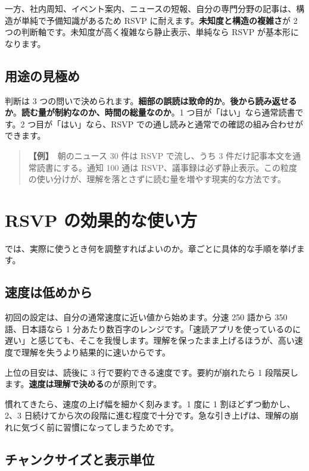 \documentclass{article}
\begin{document}
一方、社内周知、イベント案内、ニュースの短報、自分の専門分野の記事は、構造が単純で予備知識があるため RSVP に耐えます。\textbf{未知度と構造の複雑さ}が 2 つの判断軸です。未知度が高く複雑なら静止表示、単純なら RSVP が基本形になります。

\subsection{用途の見極め}

判断は 3 つの問いで決められます。\textbf{細部の誤読は致命的か}。\textbf{後から読み返せるか}。\textbf{読む量が制約なのか、時間の総量なのか}。1 つ目が「はい」なら通常読書です。2 つ目が「はい」なら、RSVP での通し読みと通常での確認の組み合わせができます。

\begin{quote}
\textbf{【例】}\ 朝のニュース 30 件は RSVP で流し、うち 3 件だけ記事本文を通常読書にする。通知 100 通は RSVP、議事録は必ず静止表示。この粒度の使い分けが、理解を落とさずに読む量を増やす現実的な方法です。
\end{quote}

\section{RSVP の効果的な使い方}

では、実際に使うとき何を調整すればよいのか。章ごとに具体的な手順を挙げます。

\subsection{速度は低めから}

初回の設定は、自分の通常速度に近い値から始めます。分速 250 語から 350 語、日本語なら 1 分あたり数百字のレンジです。「速読アプリを使っているのに遅い」と感じても、そこを我慢します。理解を保ったまま上げるほうが、高い速度で理解を失うより結果的に速いからです。

上位の目安は、読後に 3 行で要約できる速度です。要約が崩れたら 1 段階戻します。\textbf{速度は理解で決める}のが原則です。

慣れてきたら、速度の上げ幅を細かく刻みます。1 度に 1 割ほどずつ動かし、2、3 日続けてから次の段階に進む程度で十分です。急な引き上げは、理解の崩れに気づく前に習慣になってしまうためです。

\subsection{チャンクサイズと表示単位}
\end{document}
